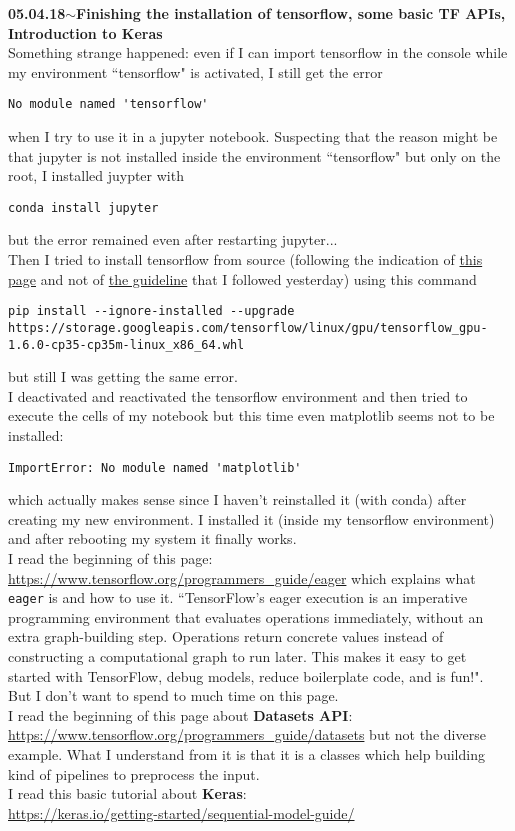 \documentclass[11pt,a4paper]{article}
\newenvironment{loggentry}[2]%
{\noindent\textbf{#1}\hspace{1cm}$\mathbf{\sim}$\text{ }\textbf{#2}\\}{\vspace{0.5cm}}
\begin{document}
\begin{loggentry}{05.04.18}{Finishing the installation of tensorflow, some basic TF APIs, Introduction to Keras}
Something strange happened: even if I can import tensorflow in the console while my environment ``tensorflow" is activated, I still get the error
\begin{verbatim}
No module named 'tensorflow'
\end{verbatim}
when I try to use it in a jupyter notebook. Suspecting that the reason might be that jupyter is not installed inside the environment ``tensorflow" but only on the root, I installed juypter with
\begin{verbatim}
conda install jupyter
\end{verbatim}
but the error remained even after restarting jupyter...\\
Then I tried to install tensorflow from source (following the indication of \href{https://www.tensorflow.org/install/install_linux#the_url_of_the_tensorflow_python_package}{this page} and not of \href{https://github.com/williamFalcon/tensorflow-gpu-install-ubuntu-16.04}{the guideline} that I followed yesterday) using this command
\begin{verbatim}
pip install --ignore-installed --upgrade https://storage.googleapis.com/tensorflow/linux/gpu/tensorflow_gpu-1.6.0-cp35-cp35m-linux_x86_64.whl
\end{verbatim}
but still I was getting the same error.\\
I deactivated and reactivated the tensorflow environment and then tried to execute the cells of my notebook but this time even matplotlib seems not to be installed:
\begin{verbatim}
ImportError: No module named 'matplotlib'
\end{verbatim}
which actually makes sense since I haven't reinstalled it (with conda) after creating my new environment. I installed it (inside my tensorflow environment) and after rebooting my system it finally works.\\
I read the beginning of this page:\\
\url{https://www.tensorflow.org/programmers_guide/eager}
which explains what \texttt{eager} is and how to use it. ``TensorFlow's eager execution is an imperative programming environment that evaluates operations immediately, without an extra graph-building step. Operations return concrete values instead of constructing a computational graph to run later. This makes it easy to get started with TensorFlow, debug models, reduce boilerplate code, and is fun!".\\
But I don't want to spend to much time on this page.\\
I read the beginning of this page about \textbf{Datasets API}:
\url{https://www.tensorflow.org/programmers_guide/datasets}
but not the diverse example. What I understand from it is that it is a classes which help building kind of pipelines to preprocess the input.\\
I read this basic tutorial about \textbf{Keras}:\\
\url{https://keras.io/getting-started/sequential-model-guide/}\\
\end{loggentry}
\end{document}
